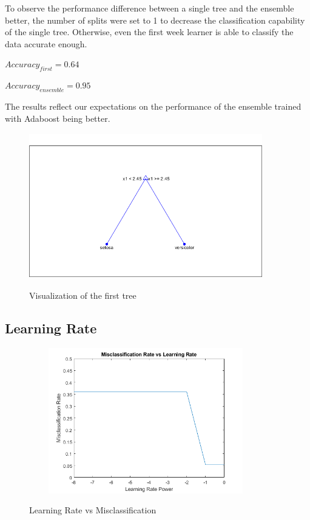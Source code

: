 \documentclass[11pt]{extarticle}
\begin{document}
To observe the performance difference between a single tree and the ensemble better, the number of splits were set to 1 to decrease the classification capability of the single tree. Otherwise, even the first week learner is able to classify the data accurate enough.\\
\begin{center}
    \begin{minipage}{0.3\textwidth}
        $Accuracy_{first} = 0.64$
        \end{minipage}
        \begin{minipage}{0.3\textwidth}
        $Accuracy_{ensemble} = 0.95$
        \end{minipage}
\end{center}
The results reflect our expectations on the performance of the ensemble trained with Adaboost being better. 
\begin{figure}[h]
    \centering
    {\includegraphics[width = 4in, height = 2.5in]{Q2T.png}}
    \caption{Visualization of the first tree}
    \label{fig:q2_tree}
\end{figure}

\subsection{Learning Rate}
\begin{figure}[h]
    \centering
    {\includegraphics[width = 4in, height = 2.5in]{lr.png}}
    \caption{Learning Rate vs Misclassification}
    \label{fig:q2_lr}
\end{figure}
\end{document}
